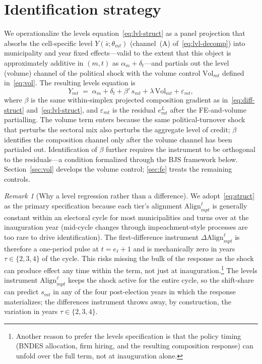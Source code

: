 \documentclass{article}
\newcommand{\Align}{\mathrm{Align}}
\newcommand{\Vol}{\mathrm{Vol}}
\theoremstyle{plain}
\theoremstyle{definition}
\theoremstyle{remark}
\newtheorem{remark}{Remark}
\begin{document}
\section{Identification strategy}\label{sec:identification}

We operationalize the levels equation~\eqref{eq:lvl-struct} as a panel
projection that absorbs the cell-specific level $Y(\bar s;\theta_{mt})$
(channel~(A) of~\eqref{eq:lvl-decomp}) into municipality and year fixed
effects---valid to the extent that this object is approximately additive
in $(m,t)$ as $\alpha_m+\delta_t$---and partials out the level (volume)
channel of the political shock with the volume control $\Vol_{mt}$ defined
in~\eqref{eq:vol}. The resulting levels equation is
\begin{equation}\label{eq:struct}
  Y_{mt} \;=\; \alpha_m + \delta_t + \beta'\,s_{mt}
            + \lambda\,\Vol_{mt} + \varepsilon_{mt},
\end{equation}
where $\beta$ is the same within-simplex projected composition gradient as
in~\eqref{eq:diff-struct} and~\eqref{eq:lvl-struct}, and $\varepsilon_{mt}$
is the residual $e^{L}_{mt}$ after the FE-and-volume partialling. The volume
term enters because the same political-turnover shock that perturbs the
sectoral mix also perturbs the aggregate level of credit; $\beta$ identifies
the composition channel only after the volume channel has been partialed out.
Identification of $\beta$ further requires the instrument to be orthogonal
to the residuals---a condition formalized
through the BJS framework below. Section~\ref{sec:vol} develops the volume
control; \autoref{sec:fe} treats the remaining controls.

\begin{remark}[Why a level regression rather than a difference]
We adopt~\eqref{eq:struct} as the primary specification because each tier's alignment $\Align^{\ell}_{mpt}$ is generally constant within an electoral cycle for most municipalities and turns over at the inauguration
year (mid-cycle changes through impeachment-style processes are too rare
to drive identification). The first-difference instrument
$\Delta\Align^{\ell}_{mpt}$ is therefore a one-period pulse at
$t=e_\ell+1$ and is mechanically zero in years $\tau\in\{2,3,4\}$ of the
cycle. This risks missing the bulk of the response as the shock can produce effect any time within the term, not just at inauguration.\footnote{Another reason to prefer the levels specification is that the policy timing (BNDES allocation, firm hiring, and the resulting composition response) can unfold over the full term, not at inauguration alone.} The levels instrument
$\Align^{\ell}_{mpt}$ keeps the shock active for the entire cycle, so the
shift-share can predict $s_{mt}$ in any of the four post-election years in
which the response materializes; the differences instrument throws away,
by construction, the variation in years $\tau\in\{2,3,4\}$.
\end{remark}
\end{document}
